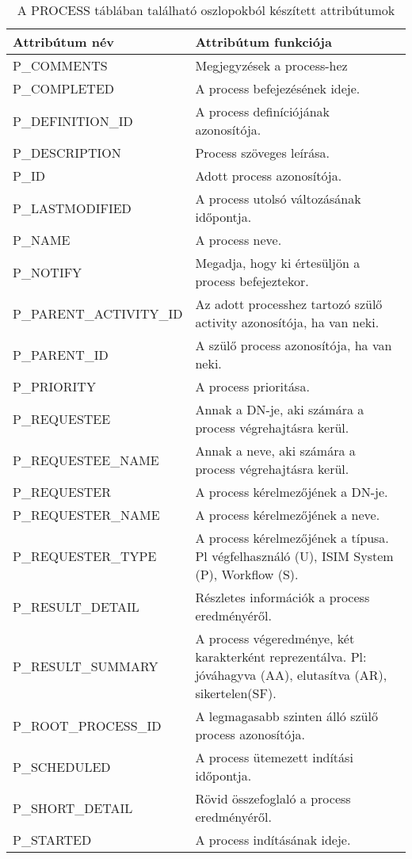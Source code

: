 \begin{table}[b]
	 \centering
	 \caption{A PROCESS táblában található oszlopokból készített attribútumok}
	\begin{tabular}{lp{10cm}}
		Attribútum név & Attribútum funkciója \\
		\toprule
		P\_COMMENTS & Megjegyzések a process-hez \\
		P\_COMPLETED & A process befejezésének ideje. \\
	P\_DEFINITION\_ID & A process definíciójának azonosítója. \\
	P\_DESCRIPTION & Process szöveges leírása. \\
	P\_ID & Adott process azonosítója. \\
	P\_LASTMODIFIED & A process utolsó változásának időpontja. \\
	P\_NAME & A process neve. \\
	P\_NOTIFY & Megadja, hogy ki értesüljön a process befejeztekor. \\
	P\_PARENT\_ACTIVITY\_ID & Az adott processhez tartozó szülő activity azonosítója, ha van neki. \\
	P\_PARENT\_ID & A szülő process azonosítója, ha van neki. \\
	P\_PRIORITY & A process prioritása. \\
	P\_REQUESTEE & Annak a DN-je, aki számára a process végrehajtásra kerül. \\
	P\_REQUESTEE\_NAME & Annak a neve, aki számára a process végrehajtásra kerül. \\
	P\_REQUESTER & A process kérelmezőjének a DN-je. \\
	P\_REQUESTER\_NAME & A process kérelmezőjének a neve. \\
	P\_REQUESTER\_TYPE & A process kérelmezőjének a típusa. Pl végfelhasználó (U), ISIM System (P), Workflow (S). \\
	P\_RESULT\_DETAIL & Részletes információk a process eredményéről. \\
	P\_RESULT\_SUMMARY & A process végeredménye, két karakterként reprezentálva. Pl: jóváhagyva (AA), elutasítva (AR), sikertelen(SF). \\
	P\_ROOT\_PROCESS\_ID & A legmagasabb szinten álló szülő process azonosítója. \\
	P\_SCHEDULED & A process ütemezett indítási időpontja. \\
	P\_SHORT\_DETAIL & Rövid összefoglaló a process eredményéről. \\
	P\_STARTED & A process indításának ideje. \\

\end{tabular}
\end{table}
